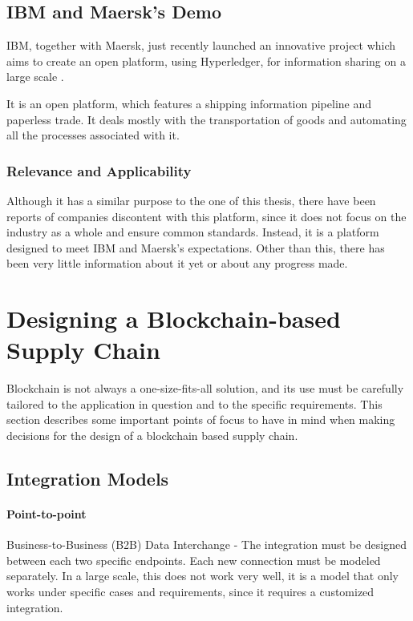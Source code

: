 
\subsection{IBM and Maersk's Demo}
IBM, together with Maersk, just recently launched an innovative project which aims to create an open platform, using Hyperledger, for information sharing on a large scale \cite{A.P.MOLLER-MAERSK}.

It is an open platform, which features a shipping information pipeline and paperless trade. It deals mostly with the transportation of goods and automating all the processes associated with it. 

\subsubsection{Relevance and Applicability}

Although it has a similar purpose to the one of this thesis, there have been reports of companies discontent with this platform, since it does not focus on the industry as a whole and ensure common standards. Instead, it is a platform designed to meet IBM and Maersk's expectations. Other than this, there has been very little information about it yet or about any progress made.



\section{Designing a Blockchain-based Supply Chain}

Blockchain is not always a one-size-fits-all solution, and its use must be carefully tailored to the application in question and to the specific requirements. This section describes some important points of focus to have in mind when making decisions for the design of a blockchain based supply chain.

\subsection{Integration Models}
\paragraph{Point-to-point} Business-to-Business (B2B) Data Interchange - The integration must be designed between each two specific endpoints. Each new connection must be modeled separately. In a large scale, this does not work very well, it is a model that only works under specific cases and requirements, since it requires a customized integration.

